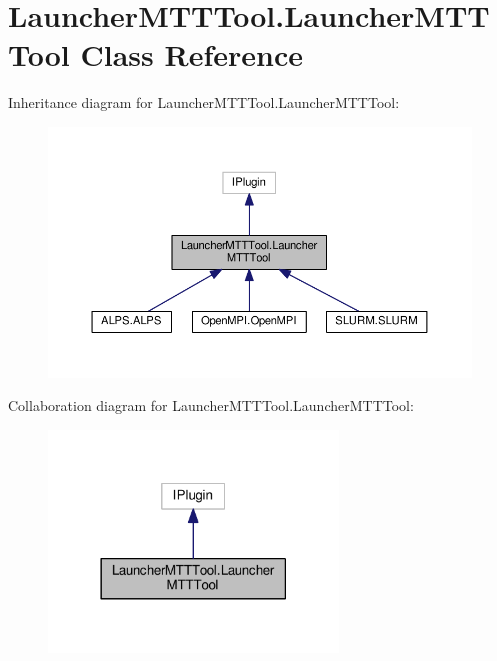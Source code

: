 \hypertarget{classLauncherMTTTool_1_1LauncherMTTTool}{\section{Launcher\-M\-T\-T\-Tool.\-Launcher\-M\-T\-T\-Tool Class Reference}
\label{classLauncherMTTTool_1_1LauncherMTTTool}
}


Inheritance diagram for Launcher\-M\-T\-T\-Tool.\-Launcher\-M\-T\-T\-Tool\-:
\nopagebreak
\begin{figure}[H]
\begin{center}
\leavevmode
\includegraphics[width=350pt]{classLauncherMTTTool_1_1LauncherMTTTool__inherit__graph}
\end{center}
\end{figure}


Collaboration diagram for Launcher\-M\-T\-T\-Tool.\-Launcher\-M\-T\-T\-Tool\-:
\nopagebreak
\begin{figure}[H]
\begin{center}
\leavevmode
\includegraphics[width=218pt]{classLauncherMTTTool_1_1LauncherMTTTool__coll__graph}
\end{center}
\end{figure}
